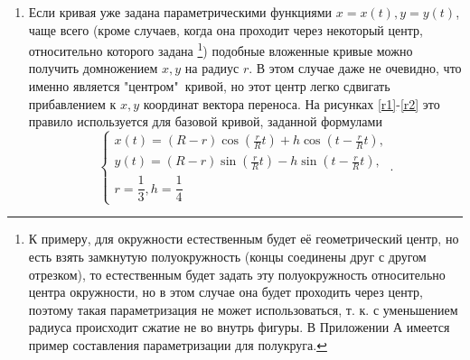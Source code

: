 \documentclass[a4paper, 12pt]{article}
\begin{document}
\begin{enumerate}
  \item Если кривая уже задана параметрическими функциями $x=x(t),y=y(t)$, чаще всего (кроме случаев, когда она проходит через некоторый центр, относительно которого задана \footnote{К примеру, для окружности естественным будет её геометрический центр, но есть взять замкнутую полуокружность (концы соединены друг с другом отрезком), то естественным будет задать эту полуокружность относительно центра окружности, но в этом случае она будет проходить через центр, поэтому такая параметризация не может использоваться, т. к. с уменьшением радиуса происходит сжатие не во внутрь фигуры. В Приложении А имеется пример составления параметризации для полукруга.}) подобные вложенные кривые можно получить домножением $x,y$ на радиус $r$.
  В этом случае даже не очевидно, что именно является "центром"\ кривой, но этот центр легко сдвигать прибавлением к $x,y$ координат вектора переноса.
  На рисунках \ref{r1}-\ref{r2} это правило используется для базовой кривой, заданной формулами
\[
\begin{cases}
  x(t)=(R-r)\cos\left(\frac{r}{R}t\right)+h \cos \left(t-\frac{r}{R}t\right),\\
  y(t)=(R-r)\sin\left(\frac{r}{R}t\right)-h \sin \left(t-\frac{r}{R}t\right),\\
  r=\dfrac{1}{3}, h=\dfrac{1}{4}
\end{cases}.  
\]


\end{enumerate}
\end{document}

